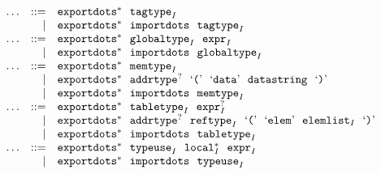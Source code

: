 $$
\begin{array}[t]{@{}lrrl@{}l@{}l@{}l@{}}
& \ldots & ::= & {{\mathtt{exportdots}}^\ast}~~{{\mathtt{tagtype}}}_{I} \\
& & | & {{\mathtt{exportdots}}^\ast}~~{\mathtt{importdots}}~~{{\mathtt{tagtype}}}_{I} \\
& \ldots & ::= & {{\mathtt{exportdots}}^\ast}~~{{\mathtt{globaltype}}}_{I}~~{{\mathtt{expr}}}_{I} \\
& & | & {{\mathtt{exportdots}}^\ast}~~{\mathtt{importdots}}~~{{\mathtt{globaltype}}}_{I} \\
& \ldots & ::= & {{\mathtt{exportdots}}^\ast}~~{{\mathtt{memtype}}}_{I} \\
& & | & {{\mathtt{exportdots}}^\ast}~~{{\mathtt{addrtype}}^?}~~\mbox{‘\texttt{{(}}’}~~\mbox{‘\texttt{data}’}~~{\mathtt{datastring}}~~\mbox{‘\texttt{{)}}’} \\
& & | & {{\mathtt{exportdots}}^\ast}~~{\mathtt{importdots}}~~{{\mathtt{memtype}}}_{I} \\
& \ldots & ::= & {{\mathtt{exportdots}}^\ast}~~{{\mathtt{tabletype}}}_{I}~~{{{\mathtt{expr}}}_{I}^?} \\
& & | & {{\mathtt{exportdots}}^\ast}~~{{\mathtt{addrtype}}^?}~~{{\mathtt{reftype}}}_{I}~~\mbox{‘\texttt{{(}}’}~~\mbox{‘\texttt{elem}’}~~{{\mathtt{elemlist}}}_{I}~~\mbox{‘\texttt{{)}}’} \\
& & | & {{\mathtt{exportdots}}^\ast}~~{\mathtt{importdots}}~~{{\mathtt{tabletype}}}_{I} \\
& \ldots & ::= & {{\mathtt{exportdots}}^\ast}~~{{\mathtt{typeuse}}}_{I}~~{{{\mathtt{local}}}_{I}^\ast}~~{{\mathtt{expr}}}_{I} \\
& & | & {{\mathtt{exportdots}}^\ast}~~{\mathtt{importdots}}~~{{\mathtt{typeuse}}}_{I} \\
\end{array}
$$

\vspace{1ex}


